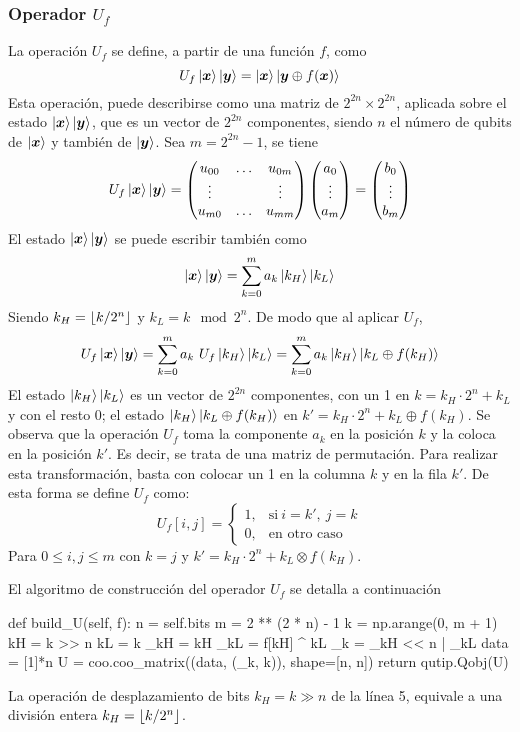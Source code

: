 \subsubsection{Operador $U_f$}
\noindent
La operación $U_f$ se define, a partir de una función $f$, como
$$ U_f \ket{\boldsymbol{x}} \ket{\boldsymbol{y}} = \ket{\boldsymbol{x}} \ket{\boldsymbol{y} \oplus f(\boldsymbol{x})} $$
Esta operación, puede describirse como una matriz de $2^{2n} \times 2^{2n}$,
aplicada sobre el estado $\ket{\boldsymbol{x}} \ket{\boldsymbol{y}}$, que es un vector de $2^{2n}$ 
componentes, siendo $n$ el número de qubits de $\ket{\boldsymbol{x}}$ y también de $\ket{
\boldsymbol{y}}$.  Sea $m = 2^{2n} -1$, se tiene
$$ U_f \ket{\boldsymbol{x}} \ket{\boldsymbol{y}} = \begin{pmatrix} 
	u_{00} & \ldots & u_{0m} \\
	\vdots &        & \vdots \\
	u_{m0} & \ldots & u_{mm} \\
 \end{pmatrix}
\begin{pmatrix} 
	a_{0} \\ \vdots \\ a_{m} \\
 \end{pmatrix}
=
\begin{pmatrix} 
	b_{0} \\ \vdots \\ b_{m} \\
 \end{pmatrix}
$$
El estado $\ket{\boldsymbol{x}} \ket{\boldsymbol{y}}$ se puede escribir también como
%
$$ \ket{\boldsymbol{x}} \ket{\boldsymbol{y}} = \sum_{k=0}^m a_k \ket{k_H}\ket{k_L} $$
%
%
Siendo $k_H = \lfloor k/2^n \rfloor$ y $k_L = k \mod 2^n$. De modo que al aplicar $U_f$,
%
$$ U_f \ket{\boldsymbol{x}} \ket{\boldsymbol{y}} = \sum_{k=0}^m a_k\ U_f \ket{k_H}\ket{k_L} =
\sum_{k=0}^m a_k \ket{k_H}\ket{k_L \oplus f(k_H)} $$
%
El estado $\ket{k_H} \ket{k_L}$ es un vector de $2^{2n}$ componentes, con un 1 
en $k = k_H \cdot 2^n + k_L$ y con el resto 0; el estado $\ket{k_H}\ket{k_L 
\oplus f(k_H)}$ en $k' = k_H \cdot 2^n + k_L \oplus f(k_H)$.  Se observa que la 
operación $U_f$ toma la componente $a_k$ en la posición $k$ y la coloca en la 
posición $k'$.  Es decir, se trata de una matriz de permutación. Para realizar 
esta transformación, basta con colocar un 1 en la columna $k$ y en la fila $k'$.  
De esta forma se define $U_f$ como:
%
\begin{equation*}
U_f[i,j] =
\begin{cases}
1, & \text{si}\ i = k',\ j = k \\
0, & \text{en otro caso}
\end{cases}
\end{equation*}
Para $0 \leq i,j \leq m$ con $k = j$ y $k' = k_H \cdot 2^n + k_L \otimes 
f(k_H)$.

%
%
\noindent
El algoritmo de construcción del operador $U_f$ se detalla a continuación
%
\begin{pycode}
def build_U(self, f):
	n = self.bits
	m = 2 ** (2 * n) - 1
	k = np.arange(0, m + 1)
	kH = k >> n
	kL = k %
	_kH = kH
	_kL = f[kH] ^ kL
	_k = _kH << n | _kL
	data = [1]*n
	U = coo.coo_matrix((data, (_k, k)), shape=[n, n])
	return qutip.Qobj(U)
\end{pycode}
%
La operación de desplazamiento de bits $k_H = k \gg n$ de la línea 5, equivale a 
una división entera $k_H = \lfloor k/2^n \rfloor$.

